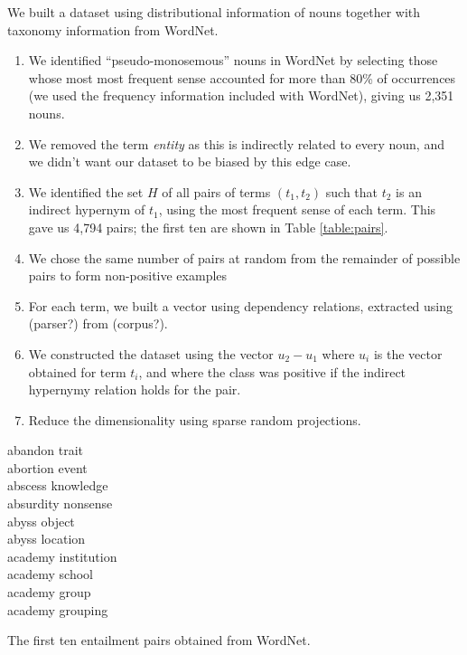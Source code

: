 \documentclass{article}
\begin{document}
We built a dataset using distributional information of nouns together
with taxonomy information from WordNet.
\begin{enumerate}
\item We identified ``pseudo-monosemous'' nouns in WordNet by
  selecting those whose most most frequent sense accounted for more
  than 80\% of occurrences (we used the frequency information included
  with WordNet), giving us 2,351 nouns.
\item We removed the term \emph{entity} as this is indirectly related
  to every noun, and we didn't want our dataset to be biased by this
  edge case.
\item We identified the set $H$ of all pairs of terms $(t_1, t_2)$
  such that $t_2$ is an indirect hypernym of $t_1$, using the most
  frequent sense of each term. This gave us 4,794 pairs; the first ten
  are shown in Table \ref{table:pairs}.
\item We chose the same number of pairs at random from the remainder
  of possible pairs to form non-positive examples
\item For each term, we built a vector using dependency relations,
  extracted using (parser?) from (corpus?).
\item We constructed the dataset using the vector $u_2 - u_1$ where
  $u_i$ is the vector obtained for term $t_i$, and where the class was
  positive if the indirect hypernymy relation holds for the pair.
\item Reduce the dimensionality using sparse random projections.
\end{enumerate}

\begin{table}
\begin{center}
\begin{minipage}{3cm}
abandon trait\\
abortion event\\
abscess knowledge\\
absurdity nonsense\\
abyss object\\
abyss location\\
academy institution\\
academy school\\
academy group\\
academy grouping\\
\end{minipage}
\end{center}
\caption{The first ten entailment pairs obtained from WordNet.}
\label{table:pairs}
\end{table}
\end{document}
